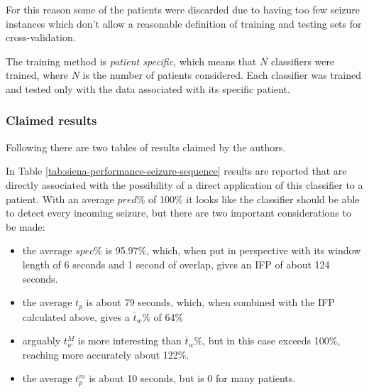 For this reason some of the patients were discarded due to having too few seizure instances which don't allow a reasonable definition of training and testing sets for cross-validation.

The training method is \textit{patient specific}, which means that $N$ classifiers were trained, where $N$ is the number of patients considered. Each classifier was trained and tested only with the data associated with its specific patient.

\subsubsection{Claimed results} \label{subsub:refwork-siena-results}
Following there are two tables of results claimed by the authors.

In Table \ref{tab:siena-performance-seizure-sequence} results are reported that are directly associated with the possibility of a direct application of this classifier to a patient.
With an average $pred\%$ of 100\% it looks like the classifier should be able to detect every incoming seizure, but there are two important considerations to be made:
\begin{itemize}
    \item the average $spec\%$ is 95.97\%, which, when put in perspective with its window length of 6 seconds and 1 second of overlap, gives an \gls{IFP} of about 124 seconds.
    \item the average $\overline{t}_p$ is about 79 seconds, which, when combined with the \gls{IFP} calculated above, gives a $\overline{t}_w\%$ of 64\%
    \item arguably $t_w^M$ is more interesting than $\overline{t}_w\%$, but in this case exceeds 100\%, reaching more accurately about 122\%.
    \item the average $t_p^m$ is about 10 seconds, but is 0 for many patients.
\end{itemize}

